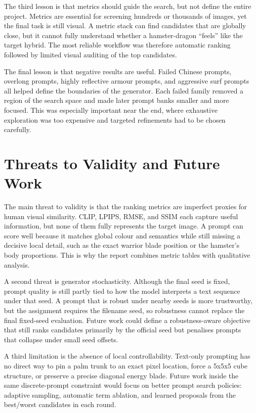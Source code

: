\documentclass[runningheads]{llncs}
\begin{document}
The third lesson is that metrics should guide the search, but not define the entire project. Metrics are essential for screening hundreds or thousands of images, yet the final task is still visual. A metric stack can find candidates that are globally close, but it cannot fully understand whether a hamster-dragon ``feels'' like the target hybrid. The most reliable workflow was therefore automatic ranking followed by limited visual auditing of the top candidates.

The final lesson is that negative results are useful. Failed Chinese prompts, overlong prompts, highly reflective armour prompts, and aggressive surf prompts all helped define the boundaries of the generator. Each failed family removed a region of the search space and made later prompt banks smaller and more focused. This was especially important near the end, where exhaustive exploration was too expensive and targeted refinements had to be chosen carefully.

\section{Threats to Validity and Future Work}

The main threat to validity is that the ranking metrics are imperfect proxies for human visual similarity. CLIP, LPIPS, RMSE, and SSIM each capture useful information, but none of them fully represents the target image. A prompt can score well because it matches global colour and semantics while still missing a decisive local detail, such as the exact warrior blade position or the hamster's body proportions. This is why the report combines metric tables with qualitative analysis.

A second threat is generator stochasticity. Although the final seed is fixed, prompt quality is still partly tied to how the model interprets a text sequence under that seed. A prompt that is robust under nearby seeds is more trustworthy, but the assignment requires the filename seed, so robustness cannot replace the final fixed-seed evaluation. Future work could define a robustness-aware objective that still ranks candidates primarily by the official seed but penalises prompts that collapse under small seed offsets.

A third limitation is the absence of local controllability. Text-only prompting has no direct way to pin a palm trunk to an exact pixel location, force a 5x5x5 cube structure, or preserve a precise diagonal energy blade. Future work inside the same discrete-prompt constraint would focus on better prompt search policies: adaptive sampling, automatic term ablation, and learned proposals from the best/worst candidates in each round.
\end{document}
